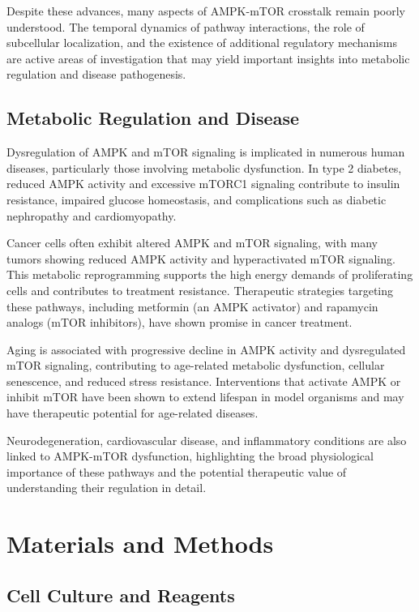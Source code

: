 \documentclass[11
pt,a4paper]{article}
\begin{document}
Despite these advances, many aspects of AMPK-mTOR crosstalk remain poorly understood. The temporal dynamics of pathway interactions, the role of subcellular localization, and the existence of additional regulatory mechanisms are active areas of investigation that may yield important insights into metabolic regulation and disease pathogenesis.

\subsection{Metabolic Regulation and Disease}

Dysregulation of AMPK and mTOR signaling is implicated in numerous human diseases, particularly those involving metabolic dysfunction. In type 2 diabetes, reduced AMPK activity and excessive mTORC1 signaling contribute to insulin resistance, impaired glucose homeostasis, and complications such as diabetic nephropathy and cardiomyopathy.

Cancer cells often exhibit altered AMPK and mTOR signaling, with many tumors showing reduced AMPK activity and hyperactivated mTOR signaling. This metabolic reprogramming supports the high energy demands of proliferating cells and contributes to treatment resistance. Therapeutic strategies targeting these pathways, including metformin (an AMPK activator) and rapamycin analogs (mTOR inhibitors), have shown promise in cancer treatment.

Aging is associated with progressive decline in AMPK activity and dysregulated mTOR signaling, contributing to age-related metabolic dysfunction, cellular senescence, and reduced stress resistance. Interventions that activate AMPK or inhibit mTOR have been shown to extend lifespan in model organisms and may have therapeutic potential for age-related diseases.



Neurodegeneration, cardiovascular disease, and inflammatory conditions are also linked to AMPK-mTOR dysfunction, highlighting the broad physiological importance of these pathways and the potential therapeutic value of understanding their regulation in detail.

\section{Materials and Methods}

\subsection{Cell Culture and Reagents}
\end{document}
